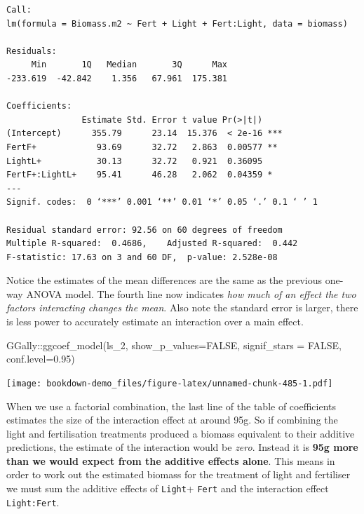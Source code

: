 \documentclass[
]{book}
\newenvironment{Shaded}{\begin{snugshade}}{\end{snugshade}}
\newcommand{\AttributeTok}[1]{\textcolor[rgb]{0.77,0.63,0.00}{#1}}
\newcommand{\ConstantTok}[1]{\textcolor[rgb]{0.00,0.00,0.00}{#1}}
\newcommand{\FloatTok}[1]{\textcolor[rgb]{0.00,0.00,0.81}{#1}}
\newcommand{\FunctionTok}[1]{\textcolor[rgb]{0.00,0.00,0.00}{#1}}
\newcommand{\NormalTok}[1]{#1}
\newcommand{\SpecialCharTok}[1]{\textcolor[rgb]{0.00,0.00,0.00}{#1}}
\begin{document}
\begin{verbatim}
Call:
lm(formula = Biomass.m2 ~ Fert + Light + Fert:Light, data = biomass)

Residuals:
     Min       1Q   Median       3Q      Max 
-233.619  -42.842    1.356   67.961  175.381 

Coefficients:
               Estimate Std. Error t value Pr(>|t|)    
(Intercept)      355.79      23.14  15.376  < 2e-16 ***
FertF+            93.69      32.72   2.863  0.00577 ** 
LightL+           30.13      32.72   0.921  0.36095    
FertF+:LightL+    95.41      46.28   2.062  0.04359 *  
---
Signif. codes:  0 ‘***’ 0.001 ‘**’ 0.01 ‘*’ 0.05 ‘.’ 0.1 ‘ ’ 1

Residual standard error: 92.56 on 60 degrees of freedom
Multiple R-squared:  0.4686,    Adjusted R-squared:  0.442 
F-statistic: 17.63 on 3 and 60 DF,  p-value: 2.528e-08
\end{verbatim}

Notice the estimates of the mean differences are the same as the previous one-way ANOVA model. The fourth line now indicates \emph{how much of an effect the two factors interacting changes the mean}. Also note the standard error is larger, there is less power to accurately estimate an interaction over a main effect.

\begin{Shaded}
\begin{Highlighting}[]
\NormalTok{GGally}\SpecialCharTok{::}\FunctionTok{ggcoef\_model}\NormalTok{(ls\_2,}
                      \AttributeTok{show\_p\_values=}\ConstantTok{FALSE}\NormalTok{,}
                      \AttributeTok{signif\_stars =} \ConstantTok{FALSE}\NormalTok{,}
                     \AttributeTok{conf.level=}\FloatTok{0.95}\NormalTok{)}
\end{Highlighting}
\end{Shaded}

\texttt{[image: bookdown-demo\_files/figure-latex/unnamed-chunk-485-1.pdf]}

When we use a factorial combination, the last line of the table of coefficients estimates the size of the interaction effect at around 95g. So if combining the light and fertilisation treatments produced a biomass equivalent to their additive predictions, the estimate of the interaction would be \emph{zero}. Instead it is \textbf{95g more than we would expect from the additive effects alone}. This means in order to work out the estimated biomass for the treatment of light and fertiliser we must sum the additive effects of \texttt{Light}+ \texttt{Fert} and the interaction effect \texttt{Light:Fert}.
\end{document}

